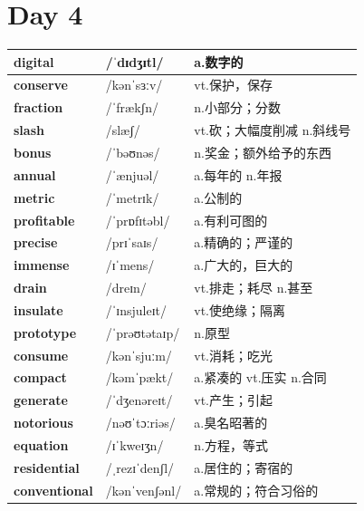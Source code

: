 \documentclass[14pt,a4paper]{extarticle}
\begin{document}
\newpage
\section{Day 4}

\begin{longtable}{ p{} p{} p{} }
\hline
\endfirsthead
\hline
\endhead
\endfoot
\endlastfoot

\textbf{digital} & /ˈdɪdʒɪtl/ & a.数字的 \\ \hline
\textbf{conserve} & /kənˈsɜːv/ & vt.保护，保存 \\ \hline
\textbf{fraction} & /ˈfrækʃn/ & n.小部分；分数 \\ \hline
\textbf{slash} & /slæʃ/ & vt.砍；大幅度削减 \quad n.斜线号 \\ \hline
\textbf{bonus} & /ˈbəʊnəs/ & n.奖金；额外给予的东西 \\ \hline
\textbf{annual} & /ˈænjuəl/ & a.每年的 \quad n.年报 \\ \hline
\textbf{metric} & /ˈmetrɪk/ & a.公制的 \\ \hline
\textbf{profitable} & /ˈprɒfɪtəbl/ & a.有利可图的 \\ \hline
\textbf{precise} & /prɪˈsaɪs/ & a.精确的；严谨的 \\ \hline
\textbf{immense} & /ɪˈmens/ & a.广大的，巨大的 \\ \hline
\textbf{drain} & /dreɪn/ & vt.排走；耗尽 \quad n.甚至 \\ \hline
\textbf{insulate} & /ˈɪnsjuleɪt/ & vt.使绝缘；隔离 \\ \hline
\textbf{prototype} & /ˈprəʊtətaɪp/ & n.原型 \\ \hline
\textbf{consume} & /kənˈsjuːm/ & vt.消耗；吃光 \\ \hline
\textbf{compact} & /kəmˈpækt/ & a.紧凑的 \quad vt.压实 \quad n.合同 \\ \hline
\textbf{generate} & /ˈdʒenəreɪt/ & vt.产生；引起 \\ \hline
\textbf{notorious} & /nəʊˈtɔːriəs/ & a.臭名昭著的 \\ \hline
\textbf{equation} & /ɪˈkweɪʒn/ & n.方程，等式 \\ \hline
\textbf{residential} & /ˌrezɪˈdenʃl/ & a.居住的；寄宿的 \\ \hline
\textbf{conventional} & /kənˈvenʃənl/ & a.常规的；符合习俗的 \\ \hline

\end{longtable}
\end{document}
